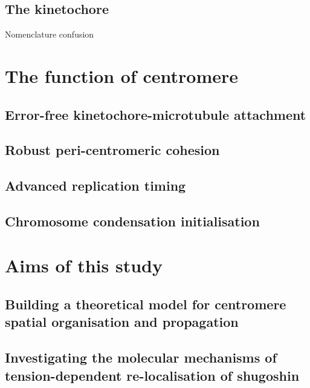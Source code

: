 
\subsection{The kinetochore}



 
Nomenclature confusion

\section{The function of centromere}
\subsection{Error-free kinetochore-microtubule attachment}
\subsection{Robust peri-centromeric cohesion}
\subsection{Advanced replication timing}
\subsection{Chromosome condensation initialisation}
\section{Aims of this study}
\subsection{Building a theoretical model for centromere spatial organisation and propagation}
\subsection{Investigating the molecular mechanisms of tension-dependent re-localisation of shugoshin}
